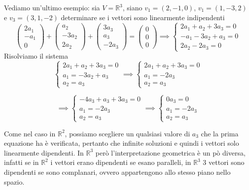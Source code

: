 \documentclass{rapport}
\begin{document}
Vediamo un'ultimo esempio: sia $V=\mathbb{R}^3$, siano $v_1=(2,-1,0)$, $v_1=(1,-3,2)$ e $v_3=(3,1,-2)$ determinare se i vettori sono linearmente indipendenti
\[
\begin{pmatrix}
2a_1 \\
-a_1 \\
0
\end{pmatrix} + \begin{pmatrix}
a_2 \\
-3a_2 \\
2a_2
\end{pmatrix} + \begin{pmatrix}
3a_3 \\
a_3 \\
-2a_3
\end{pmatrix} =
\begin{pmatrix}
0 \\
0\\
0
\end{pmatrix} \implies \begin{cases}
  2a_1+a_2+3a_3 = 0\\
  -a_1-3a_2+a_3 = 0 \\
  2a_2-2a_3=0
\end{cases} 
\]
Risolviamo il sistema
\[
 \begin{cases}
  2a_1+a_2+3a_3 = 0\\
  a_1 = -3a_2+a_3  \\
  a_2 = a_3
\end{cases}
\implies \begin{cases}
  2a_1+a_2+3a_3 = 0\\
  a_1 = -2a_3  \\
  a_2 = a_3
\end{cases}
\]

\[
\implies \begin{cases}
  -4a_3+a_3+3a_3 = 0\\
  a_1 = -2a_3   \\
  a_2 = a_3
\end{cases}\implies \begin{cases}
  0a_3= 0\\
  a_1 = -2a_3   \\
  a_2 = a_3
\end{cases}
\]

Come nel caso in $\mathbb{R}^2$, possiamo scegliere un qualsiasi valore di $a_3$ che la prima equazione ha è verificata, pertanto che infinite soluzioni e quindi i vettori solo linearmente dipendenti. In $\mathbb{R}^3$ però l'interpretazione geometrica è un pò diversa, infatti se in $\mathbb{R}^2$ i vettori erano dipendenti se esano paralleli, in $\mathbb{R}^3$ 3 vettori sono dipendenti se sono complanari, ovvero appartengono allo stesso piano nello spazio. 
\end{document}
